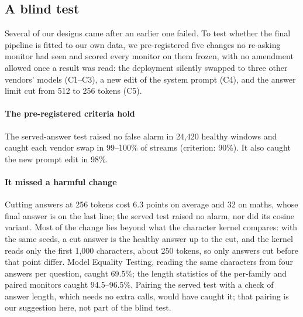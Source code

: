 \documentclass[11pt]{article}
\begin{document}
\subsection{A blind test}
\label{sec:blind}

Several of our designs came after an earlier one failed. To test whether the final
pipeline is fitted to our own data, we pre-registered five changes no re-asking
monitor had seen and scored every monitor on them frozen, with no amendment allowed
once a result was read: the deployment silently swapped to three other vendors'
models (C1--C3), a new edit of the system prompt (C4), and the answer limit cut from
512 to 256 tokens (C5).

\begin{center}\small
\setlength{\tabcolsep}{3.5pt}
\end{center}

\paragraph{The pre-registered criteria hold} The served-answer test raised no false
alarm in 24{,}420 healthy windows and caught each vendor swap in 99--100\% of
streams (criterion: 90\%). It also caught the new prompt edit in 98\%.

\paragraph{It missed a harmful change} Cutting answers at 256 tokens cost 6.3 points
on average and 32 on maths, whose final answer is on the last line; the served test
raised no alarm, nor did its cosine variant. Most of the change lies beyond what
the character kernel compares: with the same seeds, a cut answer is the healthy
answer up to the cut, and the kernel reads only the first 1{,}000 characters, about
250 tokens, so only answers cut before that point differ. Model Equality Testing,
reading the same characters from four answers per question, caught 69.5\%; the
length statistics of the per-family and paired monitors caught 94.5--96.5\%. Pairing the served test with a check of answer length,
which needs no extra calls, would have caught it; that pairing is our suggestion
here, not part of the blind test.
\end{document}
